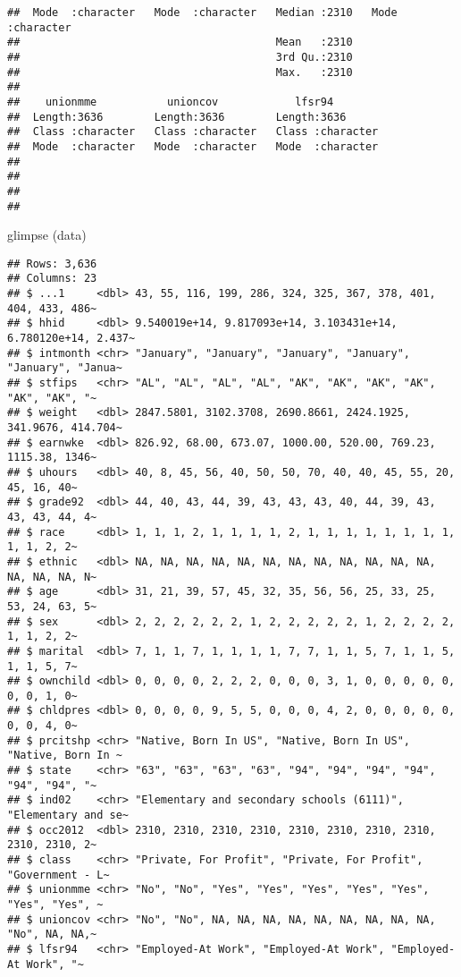 \documentclass[
]{article}
\newenvironment{Shaded}{\begin{snugshade}}{\end{snugshade}}
\newcommand{\FunctionTok}[1]{\textcolor[rgb]{0.00,0.00,0.00}{#1}}
\newcommand{\NormalTok}[1]{#1}
\begin{document}
\begin{verbatim}
##  Mode  :character   Mode  :character   Median :2310   Mode  :character  
##                                        Mean   :2310                     
##                                        3rd Qu.:2310                     
##                                        Max.   :2310                     
##                                                                         
##    unionmme           unioncov            lfsr94         
##  Length:3636        Length:3636        Length:3636       
##  Class :character   Class :character   Class :character  
##  Mode  :character   Mode  :character   Mode  :character  
##                                                          
##                                                          
##                                                          
## 
\end{verbatim}

\begin{Shaded}
\begin{Highlighting}[]
\FunctionTok{glimpse}\NormalTok{ (data)}
\end{Highlighting}
\end{Shaded}

\begin{verbatim}
## Rows: 3,636
## Columns: 23
## $ ...1     <dbl> 43, 55, 116, 199, 286, 324, 325, 367, 378, 401, 404, 433, 486~
## $ hhid     <dbl> 9.540019e+14, 9.817093e+14, 3.103431e+14, 6.780120e+14, 2.437~
## $ intmonth <chr> "January", "January", "January", "January", "January", "Janua~
## $ stfips   <chr> "AL", "AL", "AL", "AL", "AK", "AK", "AK", "AK", "AK", "AK", "~
## $ weight   <dbl> 2847.5801, 3102.3708, 2690.8661, 2424.1925, 341.9676, 414.704~
## $ earnwke  <dbl> 826.92, 68.00, 673.07, 1000.00, 520.00, 769.23, 1115.38, 1346~
## $ uhours   <dbl> 40, 8, 45, 56, 40, 50, 50, 70, 40, 40, 45, 55, 20, 45, 16, 40~
## $ grade92  <dbl> 44, 40, 43, 44, 39, 43, 43, 43, 40, 44, 39, 43, 43, 43, 44, 4~
## $ race     <dbl> 1, 1, 1, 2, 1, 1, 1, 1, 2, 1, 1, 1, 1, 1, 1, 1, 1, 1, 1, 2, 2~
## $ ethnic   <dbl> NA, NA, NA, NA, NA, NA, NA, NA, NA, NA, NA, NA, NA, NA, NA, N~
## $ age      <dbl> 31, 21, 39, 57, 45, 32, 35, 56, 56, 25, 33, 25, 53, 24, 63, 5~
## $ sex      <dbl> 2, 2, 2, 2, 2, 2, 1, 2, 2, 2, 2, 2, 1, 2, 2, 2, 2, 1, 1, 2, 2~
## $ marital  <dbl> 7, 1, 1, 7, 1, 1, 1, 1, 7, 7, 1, 1, 5, 7, 1, 1, 5, 1, 1, 5, 7~
## $ ownchild <dbl> 0, 0, 0, 0, 2, 2, 2, 0, 0, 0, 3, 1, 0, 0, 0, 0, 0, 0, 0, 1, 0~
## $ chldpres <dbl> 0, 0, 0, 0, 9, 5, 5, 0, 0, 0, 4, 2, 0, 0, 0, 0, 0, 0, 0, 4, 0~
## $ prcitshp <chr> "Native, Born In US", "Native, Born In US", "Native, Born In ~
## $ state    <chr> "63", "63", "63", "63", "94", "94", "94", "94", "94", "94", "~
## $ ind02    <chr> "Elementary and secondary schools (6111)", "Elementary and se~
## $ occ2012  <dbl> 2310, 2310, 2310, 2310, 2310, 2310, 2310, 2310, 2310, 2310, 2~
## $ class    <chr> "Private, For Profit", "Private, For Profit", "Government - L~
## $ unionmme <chr> "No", "No", "Yes", "Yes", "Yes", "Yes", "Yes", "Yes", "Yes", ~
## $ unioncov <chr> "No", "No", NA, NA, NA, NA, NA, NA, NA, NA, NA, "No", NA, NA,~
## $ lfsr94   <chr> "Employed-At Work", "Employed-At Work", "Employed-At Work", "~
\end{verbatim}
\end{document}
